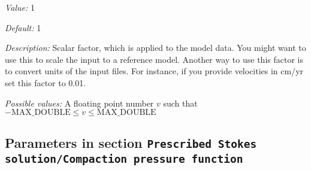 \begin{itemize}
{\it Value:} 1


{\it Default:} 1


{\it Description:} Scalar factor, which is applied to the model data. You might want to use this to scale the input to a reference model. Another way to use this factor is to convert units of the input files. For instance, if you provide velocities in cm/yr set this factor to 0.01.


{\it Possible values:} A floating point number $v$ such that $-\text{MAX\_DOUBLE} \leq v \leq \text{MAX\_DOUBLE}$
\end{itemize}

\subsection{Parameters in section \tt Prescribed Stokes solution/Compaction pressure function}
\label{parameters:Prescribed_20Stokes_20solution/Compaction_20pressure_20function}

